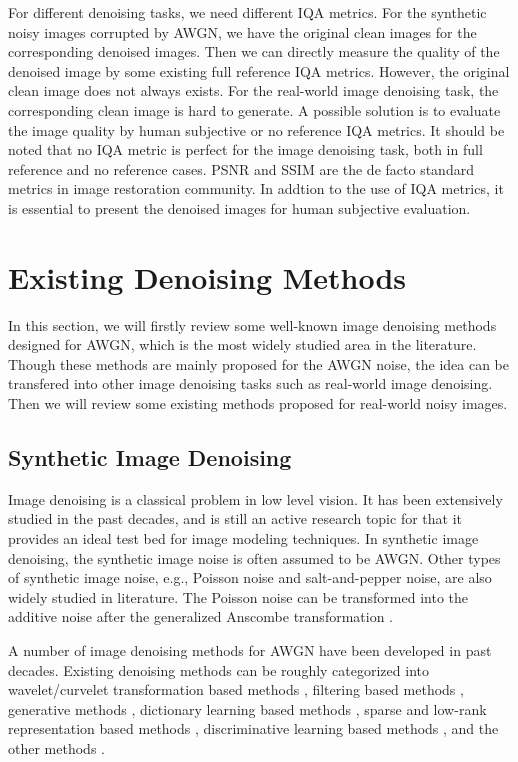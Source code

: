 For different denoising tasks, we need different IQA metrics. For the synthetic noisy images corrupted by AWGN, we have the original clean images for the corresponding denoised images. Then we can directly measure the quality of the denoised image by some existing full reference IQA metrics. However, the original clean image does not always exists. For the real-world image denoising task, the corresponding clean image is hard to generate. A possible solution is to evaluate the image quality by human subjective or no reference IQA metrics. It should be noted that no IQA metric is perfect for the image denoising task, both in full reference and no reference cases. PSNR and SSIM are the de facto standard metrics in image restoration community. In addtion to the use of IQA metrics, it is essential to present the denoised images for human subjective evaluation.


\section{Existing Denoising Methods}

In this section, we will firstly review some well-known image denoising methods designed for AWGN, which is the most widely studied area in the literature. Though these methods are mainly proposed for the AWGN noise, the idea can be transfered into other image denoising tasks such as real-world image denoising. Then we will review some existing methods proposed for real-world noisy images.

\subsection{Synthetic Image Denoising}
\label{sec:review:sys}

Image denoising is a classical problem in low level vision. It has been extensively studied in the past decades, and is still an active research topic for that it provides an ideal test bed for image modeling techniques. In synthetic image denoising, the synthetic image noise is often assumed to be AWGN. Other types of synthetic image noise, e.g., Poisson noise and salt-and-pepper noise, are also widely studied in literature. The Poisson noise can be transformed into the additive noise after the generalized Anscombe transformation \cite{makitalo2013optimal}.

A number of image denoising methods for AWGN have been developed in past decades. Existing denoising methods can be roughly categorized into wavelet/curvelet transformation based methods \cite{softthresholding,bayesshrink,curvelet}, filtering based methods \cite{Tomasi1998,blsgsm,ple,nlm}, generative methods \cite{foe,epll,gmmnips}, dictionary learning based methods \cite{ksvd,ksvdtsp,srcolor,onlinedl}, sparse and low-rank representation based methods \cite{bm3d,lssc,ncsr,nnm,wnnm}, discriminative learning based methods \cite{mlp,csf,tnrd,dncnn}, and the other methods \cite{PeronaMalik1990,rudin1992nonlinear,osher2005iterative}.

